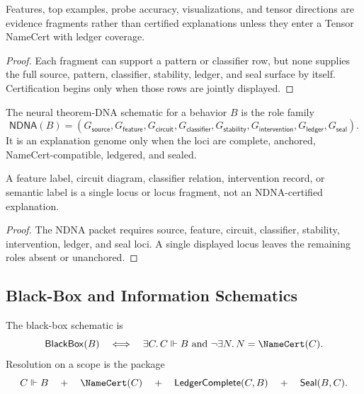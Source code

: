 \begin{theorem}
\label{thm:philosophy-feature-evidence-below-tensor-namecert}
Features, top examples, probe accuracy, visualizations, and tensor
directions are evidence fragments rather than certified explanations
unless they enter a Tensor NameCert with ledger coverage.
\end{theorem}
\begin{proof}
Each fragment can support a pattern or classifier row, but none supplies
the full source, pattern, classifier, stability, ledger, and seal
surface by itself. Certification begins only when those rows are jointly
displayed.
\end{proof}

\begin{definition}
\label{def:philosophy-ndna-schematic}
The neural theorem-DNA schematic for a behavior $B$ is the role family
$$
\mathsf{NDNA}(B)
=
(
G_{\mathsf{source}},
G_{\mathsf{feature}},
G_{\mathsf{circuit}},
G_{\mathsf{classifier}},
G_{\mathsf{stability}},
G_{\mathsf{intervention}},
G_{\mathsf{ledger}},
G_{\mathsf{seal}}
).
$$
It is an explanation genome only when the loci are complete, anchored,
NameCert-compatible, ledgered, and sealed.
\end{definition}

\begin{theorem}
\label{thm:philosophy-single-loci-not-explanation-genomes}
A feature label, circuit diagram, classifier relation, intervention
record, or semantic label is a single locus or locus fragment, not an
NDNA-certified explanation.
\end{theorem}
\begin{proof}
The NDNA packet requires source, feature, circuit, classifier,
stability, intervention, ledger, and seal loci. A single displayed locus
leaves the remaining roles absent or unanchored.
\end{proof}

\subsection{Black-Box and Information Schematics}
\label{subsec:philosophy-black-box-information-schematics}

\begin{definition}
\label{def:philosophy-black-box-schematic}
The black-box schematic is
$$
\mathsf{BlackBox}(B)
\quad\Longleftrightarrow\quad
\exists C.\, C\Vdash B
\ \text{and}\ 
\neg\exists N.\,N=\NameCert(C).
$$
Resolution on a scope is the package
$$
C\Vdash B
\quad+\quad
\NameCert(C)
\quad+\quad
\mathsf{LedgerComplete}(C,B)
\quad+\quad
\mathsf{Seal}(B,C).
$$
\end{definition}

